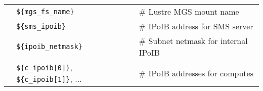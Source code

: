 \vspace*{0.2cm}
\vspace*{0.1cm}

\begin{tabular}{@{}>{\textbullet}l p{7cm} l}
& \texttt{\$\{mgs\_fs\_name\}} & {\small \# Lustre MGS mount name} \\
& \texttt{\$\{sms\_ipoib\}} & {\small \# IPoIB address for SMS server} \\
& \texttt{\$\{ipoib\_netmask\}} & {\small \# Subnet netmask for internal IPoIB} \\
& \texttt{\$\{c\_ipoib[0]\}}, \texttt{\$\{c\_ipoib[1]\}}, ... & {\small \# IPoIB addresses for computes} \\
\end{tabular}


